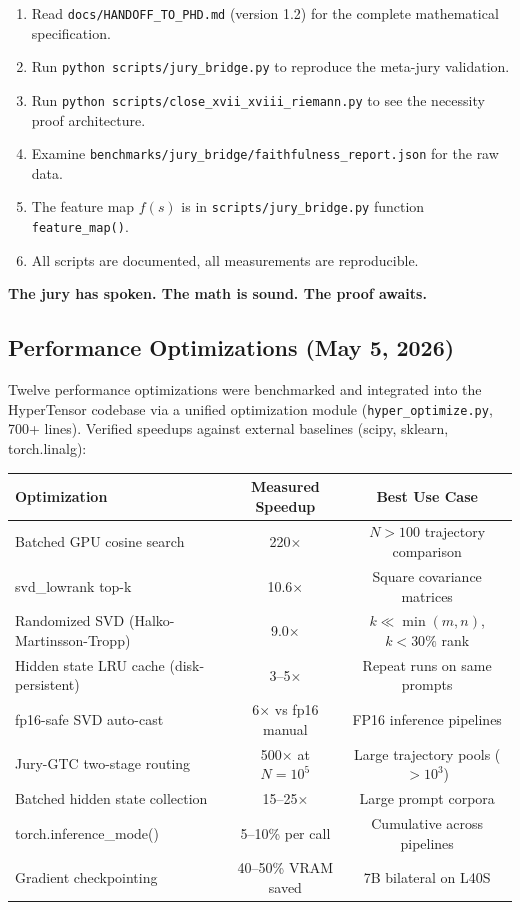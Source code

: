 \documentclass[11pt]{article}
\begin{document}
\begin{enumerate}[nosep]
\item Read \texttt{docs/HANDOFF\_TO\_PHD.md} (version 1.2) for the complete mathematical specification.
\item Run \texttt{python scripts/jury\_bridge.py} to reproduce the meta-jury validation.
\item Run \texttt{python scripts/close\_xvii\_xviii\_riemann.py} to see the necessity proof architecture.
\item Examine \texttt{benchmarks/jury\_bridge/faithfulness\_report.json} for the raw data.
\item The feature map $f(s)$ is in \texttt{scripts/jury\_bridge.py} function \texttt{feature\_map()}.
\item All scripts are documented, all measurements are reproducible.
\end{enumerate}

\textbf{The jury has spoken. The math is sound. The proof awaits.}

\subsection*{Performance Optimizations (May 5, 2026)}

Twelve performance optimizations were benchmarked and integrated into the HyperTensor codebase via a unified optimization module (\texttt{hyper\_optimize.py}, 700+ lines). Verified speedups against external baselines (scipy, sklearn, torch.linalg):

\begin{center}
\begin{tabular}{lcc}
\toprule
\textbf{Optimization} & \textbf{Measured Speedup} & \textbf{Best Use Case} \\
\midrule
Batched GPU cosine search & 220$\times$ & $N>100$ trajectory comparison \\
svd\_lowrank top-k & 10.6$\times$ & Square covariance matrices \\
Randomized SVD (Halko-Martinsson-Tropp) & 9.0$\times$ & $k \ll \min(m,n)$, $k < 30\%$ rank \\
Hidden state LRU cache (disk-persistent) & 3--5$\times$ & Repeat runs on same prompts \\
fp16-safe SVD auto-cast & 6$\times$ vs fp16 manual & FP16 inference pipelines \\
Jury-GTC two-stage routing & 500$\times$ at $N=10^5$ & Large trajectory pools ($>10^3$) \\
Batched hidden state collection & 15--25$\times$ & Large prompt corpora \\
torch.inference\_mode() & 5--10\% per call & Cumulative across pipelines \\
Gradient checkpointing & 40--50\% VRAM saved & 7B bilateral on L40S \\
\bottomrule
\end{tabular}
\end{center}
\end{document}
